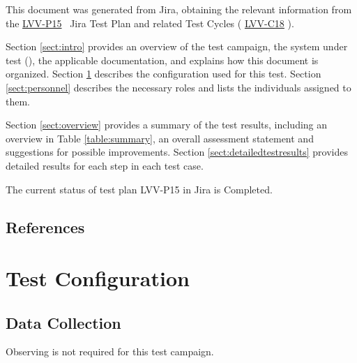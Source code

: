 \documentclass[DM,STR,toc]{lsstdoc}
\begin{document}
This document was generated from Jira, obtaining the relevant information from the 
\href{https://jira.lsstcorp.org/secure/Tests.jspa#/testPlan/LVV-P15}{LVV-P15}
~Jira Test Plan and related Test Cycles (
  \href{https://jira.lsstcorp.org/secure/Tests.jspa#/testCycle/LVV-C18}{LVV-C18}
).

Section \ref{sect:intro} provides an overview of the test campaign, the system under test (\product{}), the applicable documentation, and explains how this document is organized.
Section \ref{sect:configuration}  describes the configuration used for this test.
Section \ref{sect:personnel} describes the necessary roles and lists the individuals assigned to them.

Section \ref{sect:overview} provides a summary of the test results, including an overview in Table \ref{table:summary}, an overall assessment statement and suggestions for possible improvements.
Section \ref{sect:detailedtestresults} provides detailed results for each step in each test case.

The current status of test plan LVV-P15 in Jira is Completed.

\subsection{References}
\label{sect:references}
\renewcommand{\refname}{}

\section{Test Configuration}
\label{sect:configuration}

\subsection{Data Collection}

  Observing is not required for this test campaign.
\end{document}
